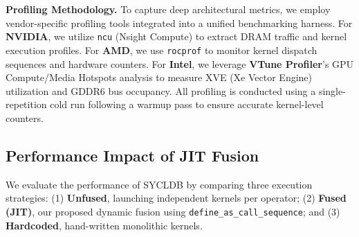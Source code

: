 \textbf{Profiling Methodology.} To capture deep architectural metrics, we employ vendor-specific profiling tools integrated into a unified benchmarking harness. For \textbf{NVIDIA}, we utilize \texttt{ncu} (Nsight Compute) to extract DRAM traffic and kernel execution profiles. For \textbf{AMD}, we use \texttt{rocprof} to monitor kernel dispatch sequences and hardware counters. For \textbf{Intel}, we leverage \textbf{VTune Profiler}'s GPU Compute/Media Hotspots analysis to measure XVE (Xe Vector Engine) utilization and GDDR6 bus occupancy. All profiling is conducted using a single-repetition cold run following a warmup pass to ensure accurate kernel-level counters.

\subsection{Performance Impact of JIT Fusion}

We evaluate the performance of SYCLDB by comparing three execution strategies: (1) \textbf{Unfused}, launching independent kernels per operator; (2) \textbf{Fused (JIT)}, our proposed dynamic fusion using \texttt{define\_as\_call\_sequence}; and (3) \textbf{Hardcoded}, hand-written monolithic kernels.


